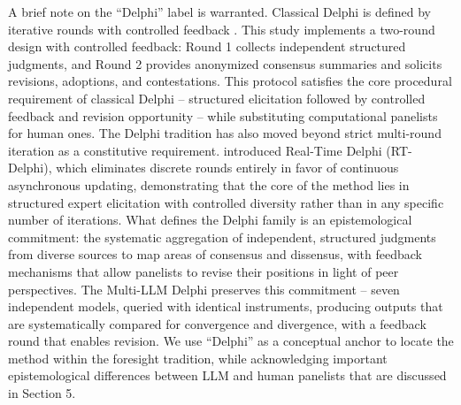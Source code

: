 \documentclass[preprint,review,12pt]{elsarticle}
\begin{document}
A brief note on the ``Delphi'' label is warranted. Classical Delphi is defined by iterative rounds with controlled feedback \citep{linstone1975delphi}. This study implements a two-round design with controlled feedback: Round 1 collects independent structured judgments, and Round 2 provides anonymized consensus summaries and solicits revisions, adoptions, and contestations. This protocol satisfies the core procedural requirement of classical Delphi -- structured elicitation followed by controlled feedback and revision opportunity -- while substituting computational panelists for human ones. The Delphi tradition has also moved beyond strict multi-round iteration as a constitutive requirement. \citet{gordon2006rtdelphi} introduced Real-Time Delphi (RT-Delphi), which eliminates discrete rounds entirely in favor of continuous asynchronous updating, demonstrating that the core of the method lies in structured expert elicitation with controlled diversity rather than in any specific number of iterations. What defines the Delphi family is an epistemological commitment: the systematic aggregation of independent, structured judgments from diverse sources to map areas of consensus and dissensus, with feedback mechanisms that allow panelists to revise their positions in light of peer perspectives. The Multi-LLM Delphi preserves this commitment -- seven independent models, queried with identical instruments, producing outputs that are systematically compared for convergence and divergence, with a feedback round that enables revision. We use ``Delphi'' as a conceptual anchor to locate the method within the foresight tradition, while acknowledging important epistemological differences between LLM and human panelists that are discussed in Section 5.
\end{document}
